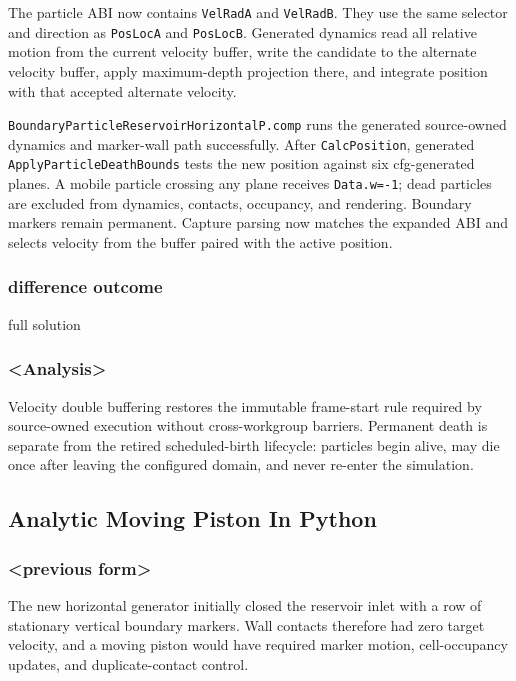 The particle ABI now contains \texttt{VelRadA} and \texttt{VelRadB}.  They use
the same selector and direction as \texttt{PosLocA} and \texttt{PosLocB}.
Generated dynamics read all relative motion from the current velocity buffer,
write the candidate to the alternate velocity buffer, apply maximum-depth
projection there, and integrate position with that accepted alternate
velocity.

\texttt{BoundaryParticleReservoirHorizontalP.comp} runs the generated
source-owned dynamics and marker-wall path successfully.  After
\texttt{CalcPosition}, generated \texttt{ApplyParticleDeathBounds} tests the
new position against six cfg-generated planes.  A mobile particle crossing any
plane receives \texttt{Data.w=-1}; dead particles are excluded from dynamics,
contacts, occupancy, and rendering.  Boundary markers remain permanent.
Capture parsing now matches the expanded ABI and selects velocity from the
buffer paired with the active position.

\subsubsection{difference outcome}

full solution

\subsubsection{<Analysis>}

Velocity double buffering restores the immutable frame-start rule required by
source-owned execution without cross-workgroup barriers.  Permanent death is
separate from the retired scheduled-birth lifecycle: particles begin alive,
may die once after leaving the configured domain, and never re-enter the
simulation.

\subsection{Analytic Moving Piston In Python}

\subsubsection{<previous form>}

The new horizontal generator initially closed the reservoir inlet with a row
of stationary vertical boundary markers.  Wall contacts therefore had zero
target velocity, and a moving piston would have required marker motion,
cell-occupancy updates, and duplicate-contact control.

